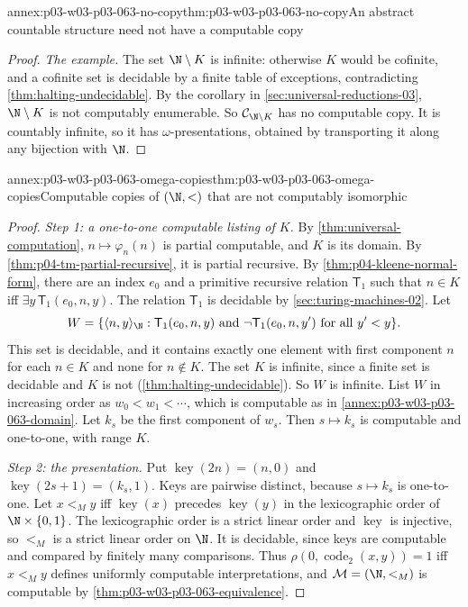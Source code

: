 \begin{annexitem}{annex:p03-w03-p03-063-no-copy}{thm:p03-w03-p03-063-no-copy}{An abstract countable structure need not have a computable copy}
\begin{proof}
\emph{The example.}  The set \(\N\setminus K\) is infinite: otherwise \(K\)
would be cofinite, and a cofinite set is decidable by a finite table of
exceptions, contradicting \cref{thm:halting-undecidable}.  By
the corollary in \cref{sec:universal-reductions-03}, \(\N\setminus K\) is not computably enumerable.
So \(\mathcal C_{\N\setminus K}\) has no computable copy.  It is countably
infinite, so it has \(\omega\)-presentations, obtained by transporting it
along any bijection with \(\N\).
\end{proof}
\end{annexitem}

\begin{annexitem}{annex:p03-w03-p03-063-omega-copies}{thm:p03-w03-p03-063-omega-copies}{Computable copies of \((\N,<)\) that are not computably isomorphic}
\begin{proof}
\emph{Step 1: a one-to-one computable listing of \(K\).}  By
\cref{thm:universal-computation}, \(n\mapsto\varphi_n(n)\) is partial
computable, and \(K\) is its domain.  By \cref{thm:p04-tm-partial-recursive},
it is partial recursive.  By \cref{thm:p04-kleene-normal-form}, there are an
index \(e_0\) and a primitive recursive relation \(\mathsf T_1\) such that
\(n\in K\) iff \(\exists y\,\mathsf T_1(e_0,n,y)\).  The relation
\(\mathsf T_1\) is decidable by \cref{sec:turing-machines-02}.  Let
\[
 W=\{\langle n,y\rangle_{\N}:\mathsf T_1(e_0,n,y)\text{ and }
 \neg\mathsf T_1(e_0,n,y')\text{ for all }y'<y\}.
\]
This set is decidable, and it contains exactly one element with first
component \(n\) for each \(n\in K\) and none for \(n\notin K\).  The set \(K\)
is infinite, since a finite set is decidable and \(K\) is not
(\cref{thm:halting-undecidable}).  So \(W\) is infinite.  List \(W\) in
increasing order as \(w_0<w_1<\cdots\), which is computable as in
\cref{annex:p03-w03-p03-063-domain}.  Let \(k_s\) be the first component of
\(w_s\).  Then \(s\mapsto k_s\) is computable and one-to-one, with range
\(K\).

\emph{Step 2: the presentation.}  Put
\(\operatorname{key}(2n)=(n,0)\) and \(\operatorname{key}(2s+1)=(k_s,1)\).
Keys are pairwise distinct, because \(s\mapsto k_s\) is one-to-one.  Let
\(x<_My\) iff \(\operatorname{key}(x)\) precedes \(\operatorname{key}(y)\) in
the lexicographic order of \(\N\times\{0,1\}\).  The lexicographic order is a
strict linear order and \(\operatorname{key}\) is injective, so \(<_M\) is a
strict linear order on \(\N\).  It is decidable, since keys are computable and
compared by finitely many comparisons.  Thus
\(\rho(0,\operatorname{code}_2(x,y))=1\) iff \(x<_My\) defines uniformly
computable interpretations, and \(\mathcal M=(\N,<_M)\) is computable by
\cref{thm:p03-w03-p03-063-equivalence}.


\end{proof}
\end{annexitem}
